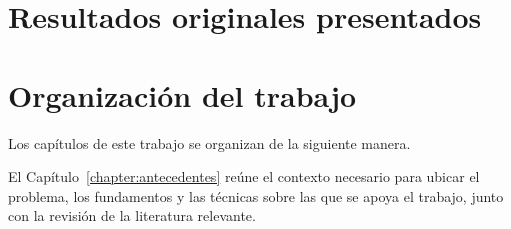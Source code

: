 \section{Resultados originales presentados}


\section{Organización del trabajo}

Los capítulos de este trabajo se organizan de la siguiente manera.

El Capítulo~\ref{chapter:antecedentes} reúne el contexto necesario para ubicar el problema, los fundamentos y las técnicas sobre las que se apoya el trabajo, junto con la revisión de la literatura relevante.

